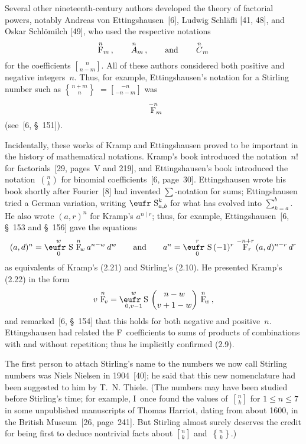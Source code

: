 Several other nineteenth-century authors developed the theory of
factorial powers, notably Andreas von Ettingshausen~[6], Ludwig
Schl\"afli [41, 48], and Oskar Schl\"omilch [49], who used the
respective notations
$$\mathop{\rm F\null}^n\!{}_m\,,\qquad
\mathop{A\null}^n\!{}_m\,,\qquad
{\rm and}\qquad
\mathop{C\null}^n\!{}_m$$
for the coefficients ${n\brack n-m}$. All of these authors considered
both positive and negative integers~$n$. Thus, for example,
Ettingshausen's notation for a Stirling number such as ${n+m\brace n}$
$={-n\brack -n-m}$ was 
$$\mathop{\rm{F}\rlap{$_m$}}^{-n}$$ (see~[6, \S~151]).

Incidentally, these works of Kramp and Ettingshausen proved to be
important in the history of mathematical notations. Kramp's book
introduced the notation~$n!$ for factorials~[29, pages~V and 219], and
Ettingshausen's book introduced the notation~${n\choose k}$ for
binomial coefficients~[6, page~30]. Ettingshausen wrote his book
shortly after Fourier~[8] had invented $\sum$-notation for sums;
Ettings\-hausen tried a German variation, writing
$\hbox{\eufr S}^k_{a,b}$ for what has evolved into $\sum_{k=a}^b$.
He also wrote $(a,r)^n$ for Kramp's $a^{n\mid r}$; thus, for example,
Ettingshausen~[6, \S~153 and \S~156] gave the equations
$$(a,d)^n=\mathop{\hbox{\eufr S}}^w_0\,\mathop{\rm F\null}^n\!{}\!_w\,
a^{n-w}\,d^w\qquad{\rm and}\qquad
a^n=\mathop{\hbox{\eufr S}}^r_0\,(-1)^r\,
\mathop{\rm F\rlap{$_r$}}^{-n+r}\,(a,d)^{n-r}\,d^r$$ 
as equivalents of Kramp's (2.21) and Stirling's (2.10). He presented
Kramp's (2.22) in the form
$$v\,
\mathop{\rm F\null}^n\!{}\!_v
=\mathop{\hbox{\eufr S}}^w_{0,v-1}\,{n-w\choose v+1-w}\,
\mathop{\rm F\null}^n\!{}\!_w\,,$$
and remarked~[6, \S~154] that this holds for both negative and
positive~$n$. Ettingshausen had related the F~coefficients
to sums of products of combinations
with and without repetition; thus he implicitly confirmed (2.9).

The first person to attach Stirling's name to the numbers we now
call Stirling numbers was Niels Nielsen in 1904~[40]; he said that
this new nomenclature had been suggested to him by T.~N. Thiele.
(The numbers may have been studied before Stirling's time; for
example, I~once found the values of~${n\brack k}$ for $1\leq n\leq 7$
in some unpublished manuscripts of Thomas Harriot, dating from about
1600, in the British Museum~[26, page~241]. But Stirling almost
surely deserves the credit for being first to deduce nontrivial facts
about ${n\brack k}$ and~${n\brace k}$.)

